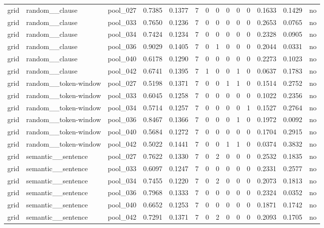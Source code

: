 \begin{table}[t]
{\begin{tabular}{llllllllllllll}
grid & random\_\_clause & pool\_027 & 0.7385 & 0.1377 & 7 & 0 & 0 & 0 & 0 & 0 & 0.1633 & 0.1429 & no \\
grid & random\_\_clause & pool\_033 & 0.7650 & 0.1236 & 7 & 0 & 0 & 0 & 0 & 0 & 0.2653 & 0.0765 & no \\
grid & random\_\_clause & pool\_034 & 0.7424 & 0.1234 & 7 & 0 & 0 & 0 & 0 & 0 & 0.2328 & 0.0905 & no \\
grid & random\_\_clause & pool\_036 & 0.9029 & 0.1405 & 7 & 0 & 1 & 0 & 0 & 0 & 0.2044 & 0.0331 & no \\
grid & random\_\_clause & pool\_040 & 0.6178 & 0.1290 & 7 & 0 & 0 & 0 & 0 & 0 & 0.2273 & 0.1023 & no \\
grid & random\_\_clause & pool\_042 & 0.6741 & 0.1395 & 7 & 1 & 0 & 0 & 1 & 0 & 0.0637 & 0.1783 & no \\
grid & random\_\_token-window & pool\_027 & 0.5198 & 0.1371 & 7 & 0 & 0 & 1 & 1 & 0 & 0.1514 & 0.2752 & no \\
grid & random\_\_token-window & pool\_033 & 0.6045 & 0.1258 & 7 & 0 & 0 & 0 & 0 & 0 & 0.1022 & 0.2356 & no \\
grid & random\_\_token-window & pool\_034 & 0.5714 & 0.1257 & 7 & 0 & 0 & 0 & 0 & 1 & 0.1527 & 0.2764 & no \\
grid & random\_\_token-window & pool\_036 & 0.8467 & 0.1366 & 7 & 0 & 0 & 0 & 1 & 0 & 0.1972 & 0.0092 & no \\
grid & random\_\_token-window & pool\_040 & 0.5684 & 0.1272 & 7 & 0 & 0 & 0 & 0 & 0 & 0.1704 & 0.2915 & no \\
grid & random\_\_token-window & pool\_042 & 0.5022 & 0.1441 & 7 & 0 & 0 & 1 & 1 & 0 & 0.0374 & 0.3832 & no \\
grid & semantic\_\_sentence & pool\_027 & 0.7622 & 0.1330 & 7 & 0 & 2 & 0 & 0 & 0 & 0.2532 & 0.1835 & no \\
grid & semantic\_\_sentence & pool\_033 & 0.6097 & 0.1247 & 7 & 0 & 0 & 0 & 0 & 0 & 0.2331 & 0.2577 & no \\
grid & semantic\_\_sentence & pool\_034 & 0.7455 & 0.1220 & 7 & 0 & 2 & 0 & 0 & 0 & 0.2073 & 0.1813 & no \\
grid & semantic\_\_sentence & pool\_036 & 0.7968 & 0.1333 & 7 & 0 & 0 & 0 & 0 & 0 & 0.2324 & 0.0352 & no \\
grid & semantic\_\_sentence & pool\_040 & 0.6652 & 0.1253 & 7 & 0 & 0 & 0 & 0 & 0 & 0.1871 & 0.1742 & no \\
grid & semantic\_\_sentence & pool\_042 & 0.7291 & 0.1371 & 7 & 0 & 2 & 0 & 0 & 0 & 0.2093 & 0.1705 & no \\

\end{tabular}}
\end{table}
